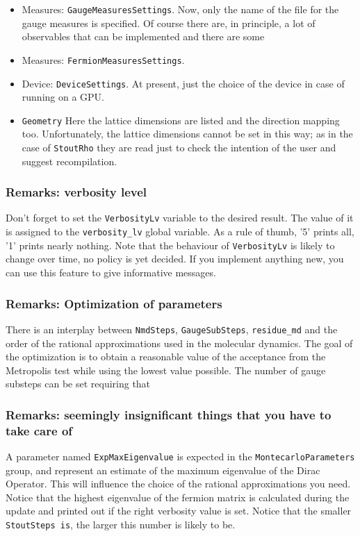 \documentclass[a4paper,10pt]{book}
\begin{document}
\begin{itemize}
  \item{Measures: \verb|GaugeMeasuresSettings|.} Now, only the name of the 
file for the gauge measures is specified. Of course there are, in principle, a 
lot of observables that can be implemented and there are some 
  \item{Measures: \verb|FermionMeasuresSettings|.}
  \item{Device: \verb|DeviceSettings|.} At present, just the choice of the 
device in case of running on a GPU.
  \item{\verb|Geometry|} Here the lattice dimensions are listed and the 
direction mapping too. Unfortunately, the lattice dimensions cannot be set in 
this way; as in the case of \verb|StoutRho| they are read just to check the 
intention of the user and suggest recompilation.  
 \end{itemize}


   \subsubsection{Remarks: verbosity level}
  Don't forget to set the \verb|VerbosityLv| variable to the desired result. 
  The value of it is assigned to the \verb|verbosity_lv| global variable.
  As a rule of thumb, '5' prints all, '1' prints nearly nothing. Note
  that the behaviour of \verb|VerbosityLv| is likely to change over time, no
  policy is yet decided. If you implement anything new, you can use this 
feature to give informative messages.
  
 \subsubsection{Remarks: Optimization of parameters}
 
 There is an interplay between \verb|NmdSteps|, \verb|GaugeSubSteps|,
 \verb|residue_md| and the order of the rational approximations used in the 
 molecular dynamics. The goal of the optimization is to obtain a reasonable 
 value of the acceptance from the Metropolis test while using the lowest value 
 possible. The number of gauge substeps can be set requiring that 
  
  
  \subsubsection{Remarks: seemingly insignificant things that you have to take 
care of}
  A parameter named \verb|ExpMaxEigenvalue| is expected in the 
\verb|MontecarloParameters| group, and represent an estimate
  of the maximum eigenvalue of the Dirac Operator. This will influence
  the choice of the rational approximations you need. Notice that the highest 
eigenvalue of the fermion matrix is calculated during the update and printed 
out if the right verbosity value is set. Notice that the smaller 
\verb|StoutSteps is|, the larger this number is likely to be. 
  
\end{document}
